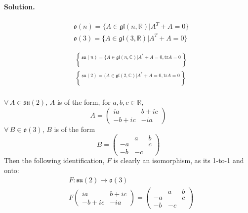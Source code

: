 \paragraph{Solution.}

\[
\begin{aligned}
  & \mathfrak{o}{(n)} = \lbrace A \in \mathfrak{gl}(n,\mathbb{R}) | A^T + A = 0 \rbrace \\ 
  & \mathfrak{o}{(3)} = \lbrace A \in \mathfrak{gl}(3,\mathbb{R}) | A^T + A = 0 \rbrace 
\end{aligned}
\]


\[
\begin{aligned}
& \mathfrak{su}(n) = \lbrace A \in \mathfrak{gl}(n,\mathbb{C}) | A^* + A = 0 , \text{tr}A = 0 \brace \\ 
& \mathfrak{su}(2) = \lbrace A \in \mathfrak{gl}(2,\mathbb{C}) | A^* + A = 0 , \text{tr}A = 0 \brace \\ 
\end{aligned}
\]

$\forall \, A \in \mathfrak{su}(2)$, $A$ is of the form, for $a,b,c \in \mathbb{R}$, 
\[
A = \left( \begin{matrix} ia & b + ic \\ 
  -b + i c & -ia \end{matrix} \right)
\]
$\forall \, B \in \mathfrak{o}(3)$, $B$ is of the form 
\[
B = \left( \begin{matrix}  & a & b \\ 
  -a & & c \\ 
  -b & -c & \end{matrix} \right)
\]
Then the following identification, $F$ is clearly an isomorphism, as its 1-to-1 and onto:
\[
\begin{aligned}
  & F : \mathfrak{su}(2) \to \mathfrak{o}(3) \\ 
  & F\left( \begin{matrix} ia & b + ic \\ 
    -b + ic & -ia \end{matrix} \right) = \left( \begin{matrix} & a & b \\ 
    -a & & c \\
    -b & -c & \end{matrix} \right)
\end{aligned}
\]
